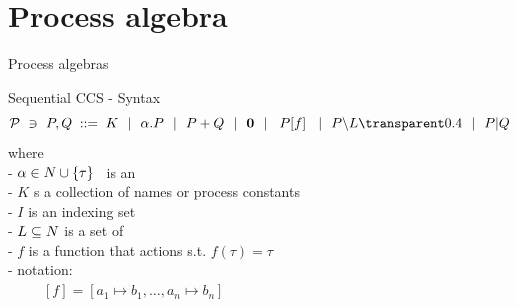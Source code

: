 \documentclass[aspectratio=169]{beamer}
\begin{document}
%
%
%
%
%


\section{Process algebra}

\begin{slide}{Process algebras}
\small

\begin{block}{Sequential CCS - Syntax}
\begin{equation*}
\mathcal{P} ~\ni~ P,Q\; ::=\; K ~~|~~ \alpha.P ~~|~~ P + Q ~~|~~ \cnil
        ~~|~~ \crn P f  ~~|~~ P\backslash L \faded{~~|~~ P|Q}
\end{equation*}
%
where
\\- $\alpha \in \Act %
    \cup \set{\tau}$~ is an 
\\- $K$ s a collection of  names or process constants
\\- $I$ is an indexing set
\\- $L \subseteq \Act %
    $ is a set of 
\\- $f$ is a function that  actions s.t. $f(\tau) = \tau$ %
\\- \alert{notation:}
\\~~~~~$[f] = [a_1\mapsto b_1,\ldots,a_n \mapsto b_n]$
\end{block}
\end{slide}
\end{document}
